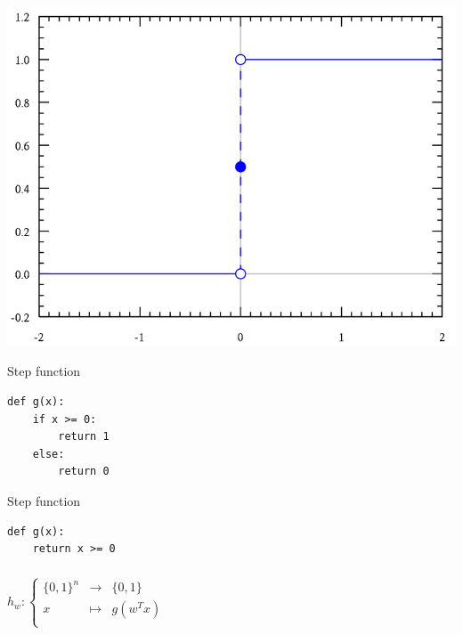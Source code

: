 \begin{frame}
  \begin{center}
    \includegraphics[scale=0.4]{./pictures/step_function.png}
  \end{center}
\end{frame}

\begin{frame}[fragile]
  \begin{block}{Step function}
      \begin{lstlisting}
def g(x):
    if x >= 0:
        return 1
    else:
        return 0
      \end{lstlisting}
  \end{block}
\end{frame}

\begin{frame}[fragile]
  \begin{block}{Step function}
      \begin{lstlisting}
def g(x):
    return x >= 0
      \end{lstlisting}
  \end{block}
\end{frame}


\begin{frame}
  \frametitle{}
  $h_w:
  \left \{
    \begin{array}{ccc}
      \{0, 1\}^n & \to & \{0, 1\} \\
      x & \mapsto &
      g(w^T x) \\
    \end{array}
  \right.$
\end{frame}


